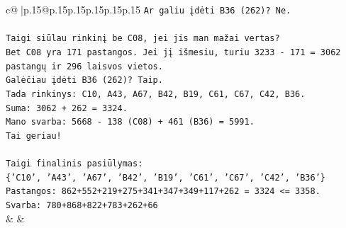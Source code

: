 \documentclass{article}
\begin{document}
{\begin{supertabular}{c@{$\;$}|p{.15\linewidth}@{}p{.15\linewidth}p{.15\linewidth}p{.15\linewidth}p{.15\linewidth}p{.15\linewidth}}
{{{\texttt{Ar galiu įdėti B36 (262)? Ne.} \\
\\ 
\texttt{Taigi siūlau rinkinį be C08, jei jis man mažai vertas?} \\
\texttt{Bet C08 yra 171 pastangos. Jei jį išmesiu, turiu 3233 {-} 171 = 3062 pastangų ir 296 laisvos vietos.} \\
\texttt{Galėčiau įdėti B36 (262)? Taip.} \\
\texttt{Tada rinkinys: C10, A43, A67, B42, B19, C61, C67, C42, B36.} \\
\texttt{Suma: 3062 + 262 = 3324.} \\
\texttt{Mano svarba: 5668 {-} 138 (C08) + 461 (B36) = 5991.} \\
\texttt{Tai geriau!} \\
\\ 
\texttt{Taigi finalinis pasiūlymas:} \\
\texttt{\{'C10', 'A43', 'A67', 'B42', 'B19', 'C61', 'C67', 'C42', 'B36'\}} \\
\texttt{Pastangos: 862+552+219+275+341+347+349+117+262 = 3324 <= 3358.} \\
\texttt{Svarba: 780+868+822+783+262+66} \\
            }
        }
    }
    & & \\ \\


\end{supertabular}}
\end{document}
